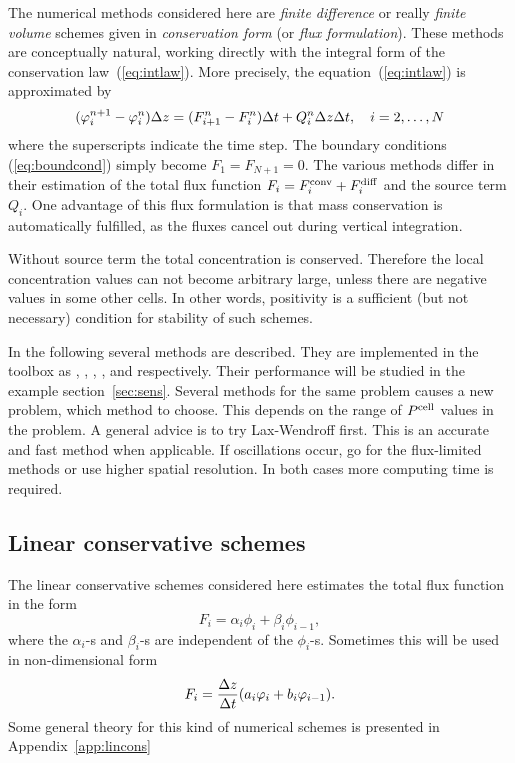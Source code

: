 The numerical methods considered here are \emph{finite difference} or
really \emph{finite volume} schemes given in \emph{conservation
form} (or \emph{flux
formulation}).  These methods are
conceptually natural, working directly with the integral form of the
conservation law~(\ref{eq:intlaw}).  More precisely, the
equation~(\ref{eq:intlaw}) is approximated by
\begin{equation}\label{eq:numlaw}
  (\varphi_i^{n+1} - \varphi_i^n) \Delta z = 
           (F_{i+1}^n - F_i^n) \Delta t + Q_i^n \Delta z \Delta t ,
           \quad i = 2, \dots, N
\end{equation}
where the superscripts indicate the time step. 
The boundary conditions (\ref{eq:boundcond}) simply become
$F_1 = F_{N+1} = 0$. The various methods
differ in their estimation of the total flux function $F_i = F^{\mathrm{conv}}_i
+ F^{\mathrm{diff}}_i$ and the source term $Q_i$.  One advantage of this flux
formulation is that mass conservation is automatically fulfilled, as
the fluxes cancel out during vertical integration.

Without source term the total concentration is conserved. Therefore
the local concentration values can not become arbitrary large, unless
there are negative values in some other cells. In other words,
positivity is a sufficient (but not necessary) condition for stability
of such schemes.

In the following several methods are described.  They are implemented in
the toolbox as , , ,
, and  respectively. Their performance
will be studied in the example section~\ref{sec:sens}. Several methods
for the same problem causes a new problem, which method to choose. This
depends on the range of $P^{\mathrm{cell}}$ values in the problem. A general
advice is to try Lax-Wendroff first. This is an accurate and fast method
when applicable. If oscillations occur, go for the flux-limited
methods or use higher spatial resolution.  In both cases more computing
time is required. 



\subsection{Linear conservative schemes}\label{seq:linsch}

The linear conservative schemes considered here estimates the total 
flux function in the form 
\begin{equation}\label{eq:alphabeta}
  F_i = \alpha_i \phi_i + \beta_i \phi_{i-1} ,
\end{equation}
where the $\alpha_i$-s and $\beta_i$-s are independent of 
the $\phi_i$-s. Sometimes this will be used in non-dimensional form
\begin{equation}\label{eq:ab}
  F_i = \frac{\Delta z}{\Delta t} (a_i \varphi_i + b_i \varphi_{i-1}) .
\end{equation}
Some general theory for this kind of numerical schemes is presented
in Appendix~\ref{app:lincons}


